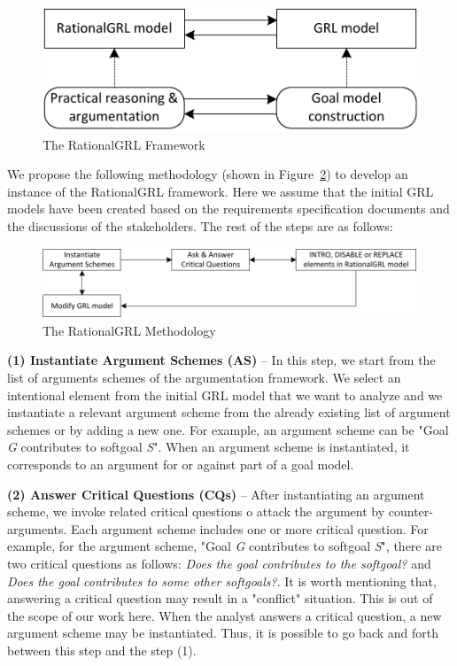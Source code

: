 \begin{figure}[ht]
\centering
\includegraphics[scale=0.4]{img/framework}
\caption{The RationalGRL Framework}
\label{fig:rationalgrl-framework}
\end{figure}

We propose the following methodology (shown in Figure~\ref{fig:rationalgrl-methodology}) to develop an instance of the RationalGRL framework. Here we assume that the initial GRL models have been created based on the requirements specification documents and the discussions of the stakeholders. The rest of the steps are as follows:

\begin{figure}[ht]
\centering
\includegraphics[scale=0.4]{img/methodology}
\caption{The RationalGRL Methodology}
\label{fig:rationalgrl-methodology}
\end{figure}


\textbf{(1) Instantiate Argument Schemes (AS)} -- In this step, we start from the list of arguments schemes of the argumentation framework. We select an intentional element from the initial GRL model that we want to analyze and we instantiate a relevant argument scheme from the already existing list of argument schemes or by adding a new one. For example, an argument scheme can be "Goal \emph{G} contributes to softgoal \emph{S}". When an argument scheme is instantiated, it corresponds to  an argument for or against part of a goal model.

\textbf{(2) Answer Critical Questions (CQs)} -- After instantiating an argument scheme, we invoke related critical questions o attack the argument by counter-arguments.  Each argument scheme includes one or more critical question. For example, for the argument scheme, "Goal \emph{G} contributes to softgoal \emph{S}", there are two critical questions as follows:  \emph{Does the goal contributes to the softgoal?} and \emph{Does the goal contributes to some other softgoals?}. It is worth mentioning that, answering a critical question may result in a "conflict" situation. This is out of the scope of our work here.  When the analyst answers  a critical question, a new argument scheme may be instantiated.  Thus, it is possible to go back and forth between this step and the step (1).

